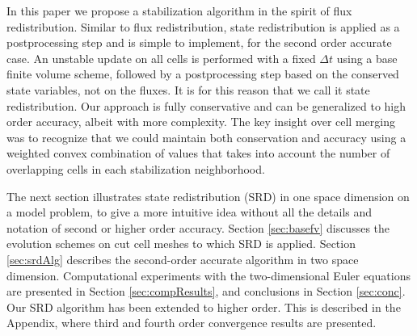 In this paper we propose a stabilization algorithm in
the spirit of flux redistribution. Similar to flux redistribution, state
redistribution is applied as a postprocessing step and is simple to implement,
for the second order accurate case. An unstable update on all cells is
performed with a fixed $\Delta t$ using a base finite volume scheme, followed
by a postprocessing step based on the conserved state variables, not on the
fluxes.  It is for this reason that we call it state redistribution.  Our
approach is fully conservative and can be generalized to high order accuracy,
albeit with  more complexity. The key insight over cell merging was to
recognize that we could maintain both conservation and accuracy using a
weighted convex combination of values that takes into account the number of
overlapping cells in each stabilization neighborhood.

The next section illustrates state redistribution (SRD) in one space dimension
on a model problem, to give a more intuitive idea without all the details and 
notation of second or higher order accuracy. 
Section \ref{sec:basefv} discusses the evolution schemes on cut cell meshes
to which SRD is applied.
Section \ref{sec:srdAlg} describes the second-order accurate
algorithm in two space dimension.  Computational experiments with the
two-dimensional Euler equations  are presented in
Section \ref{sec:compResults}, and conclusions in Section \ref{sec:conc}. 
Our SRD  algorithm has been extended
to higher order. This is described in the Appendix, where third and fourth order
convergence results are presented.

